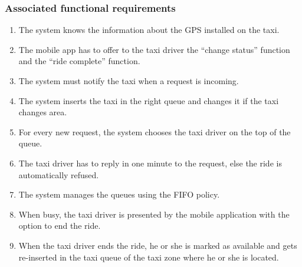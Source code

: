 \subsubsection{Associated functional requirements}
\begin{enumerate}
\item The system knows the information about the GPS installed on the taxi.
\item The mobile app has to offer to the taxi driver the ``change status'' function and the ``ride complete'' function.
\item The system must notify the taxi when a request is incoming.
\item The system inserts the taxi in the right queue and changes it if the taxi changes area.
\item For every new request, the system chooses the taxi driver on the top of the queue.
\item The taxi driver has to reply in one minute to the request, else the ride is automatically refused.
\item The system manages the queues using the FIFO policy.
\item When busy, the taxi driver is presented by the mobile application with the option to end the ride.
\item When the taxi driver ends the ride, he or she is marked as available and gets re-inserted in the taxi queue of the taxi zone where he or she is located.
\end{enumerate}
